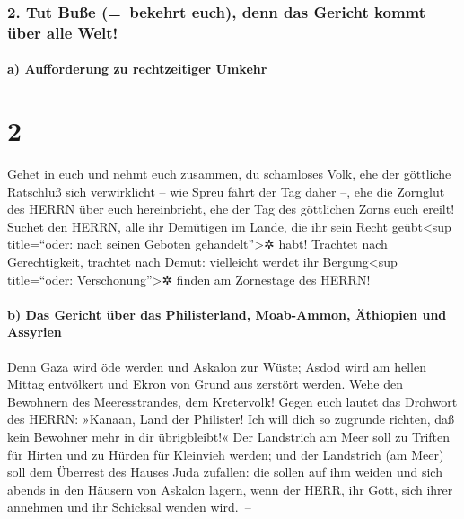 \hypertarget{tut-buuxdfe-bekehrt-euch-denn-das-gericht-kommt-uxfcber-alle-welt}{%
\subsubsection{2. Tut Buße (=~bekehrt euch), denn das Gericht kommt über
alle
Welt!}\label{tut-buuxdfe-bekehrt-euch-denn-das-gericht-kommt-uxfcber-alle-welt}}

\hypertarget{a-aufforderung-zu-rechtzeitiger-umkehr}{%
\paragraph{a) Aufforderung zu rechtzeitiger
Umkehr}\label{a-aufforderung-zu-rechtzeitiger-umkehr}}

\hypertarget{section-1}{%
\section{2}\label{section-1}}

 Gehet in euch und nehmt euch zusammen, du schamloses
Volk,  ehe der göttliche Ratschluß sich verwirklicht --
wie Spreu fährt der Tag daher --, ehe die Zornglut des HERRN über euch
hereinbricht, ehe der Tag des göttlichen Zorns euch ereilt!
 Suchet den HERRN, alle ihr Demütigen im Lande, die ihr
sein Recht geübt\textless sup title=``oder: nach seinen Geboten
gehandelt''\textgreater✲ habt! Trachtet nach Gerechtigkeit, trachtet
nach Demut: vielleicht werdet ihr Bergung\textless sup title=``oder:
Verschonung''\textgreater✲ finden am Zornestage des HERRN!

\hypertarget{b-das-gericht-uxfcber-das-philisterland-moab-ammon-uxe4thiopien-und-assyrien}{%
\paragraph{b) Das Gericht über das Philisterland, Moab-Ammon, Äthiopien
und
Assyrien}\label{b-das-gericht-uxfcber-das-philisterland-moab-ammon-uxe4thiopien-und-assyrien}}

 Denn Gaza wird öde werden und Askalon zur Wüste; Asdod
wird am hellen Mittag entvölkert und Ekron von Grund aus zerstört
werden.  Wehe den Bewohnern des Meeresstrandes, dem
Kretervolk! Gegen euch lautet das Drohwort des HERRN: »Kanaan, Land der
Philister! Ich will dich so zugrunde richten, daß kein Bewohner mehr in
dir übrigbleibt!«  Der Landstrich am Meer soll zu Triften
für Hirten und zu Hürden für Kleinvieh werden;  und der
Landstrich (am Meer) soll dem Überrest des Hauses Juda zufallen: die
sollen auf ihm weiden und sich abends in den Häusern von Askalon lagern,
wenn der HERR, ihr Gott, sich ihrer annehmen und ihr Schicksal wenden
wird.~--

